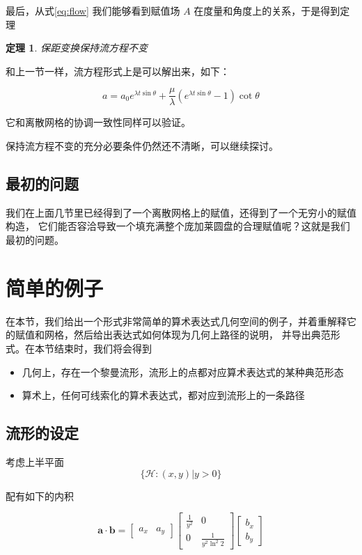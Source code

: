\documentclass[a4paper,12pt]{article}
\numberwithin{definition}{section}
\numberwithin{lemma}{section}
\numberwithin{proposition}{section}
\newtheorem{theorem}{定理}
\numberwithin{theorem}{section}
\numberwithin{grammar}{section}
\numberwithin{program}{section}
\numberwithin{convention}{section}
\numberwithin{corollary}{section}
\begin{document}
最后，从式\eqref{eq:flow} 我们能够看到赋值场 $A$ 在度量和角度上的关系，于是得到定理

\begin{theorem}
保距变换保持流方程不变\label{thm:isometry}
\end{theorem}

和上一节一样，流方程形式上是可以解出来，如下：

\begin{equation}
   a =  a_0 e^{\lambda t \sin \theta} + \frac{\mu}{\lambda} (e^{\lambda t \sin \theta} - 1) \cot \theta
\end{equation}

它和离散网格的协调一致性同样可以验证。

保持流方程不变的充分必要条件仍然还不清晰，可以继续探讨。

\subsection{最初的问题}

我们在上面几节里已经得到了一个离散网格上的赋值，还得到了一个无穷小的赋值构造，
它们能否容洽导致一个填充满整个庞加莱圆盘的合理赋值呢？这就是我们最初的问题。

\newpage

\section{简单的例子}

在本节，我们给出一个形式非常简单的算术表达式几何空间的例子，并着重解释它的赋值和网格，然后给出表达式如何体现为几何上路径的说明，
并导出典范形式。在本节结束时，我们将会得到
\begin{itemize}
    \item 几何上，存在一个黎曼流形，流形上的点都对应算术表达式的某种典范形态
    \item 算术上，任何可线索化的算术表达式，都对应到流形上的一条路径
\end{itemize}

\subsection{流形的设定}

考虑上半平面
\[
\{\mathcal{H}: (x, y) | y > 0 \}
\]

配有如下的内积

\[
\mathbf{a} \cdot \mathbf{b} = \begin{bmatrix} a_x & a_y \end{bmatrix} \begin{bmatrix} \frac{1}{y^2} & 0 \\ 0 & \frac{1}{y^2\ln^2{2}} \end{bmatrix} \begin{bmatrix} b_x \\ b_y \end{bmatrix}
\]
\end{document}
